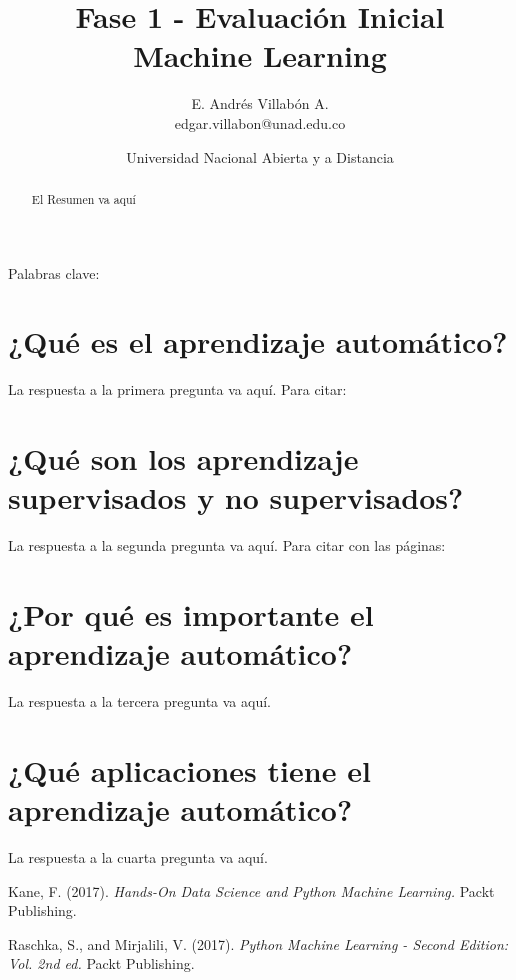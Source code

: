 \documentclass[12pt]{article}
\title{Fase 1 - Evaluación Inicial \\
Machine Learning}
\author{E. Andrés Villabón A.\\
\small{edgar.villabon@unad.edu.co}}
\date{Universidad Nacional Abierta y a Distancia}
\begin{document}
\maketitle
\begin{abstract}
El Resumen va aquí
\end{abstract}

Palabras clave: 

\section{¿Qué es el aprendizaje automático?}
La respuesta a la primera pregunta va aquí. Para citar: \cite{Kane}

\section{¿Qué son los aprendizaje supervisados y no supervisados?}
La respuesta a la segunda pregunta va aquí. Para citar con las páginas: \cite[pag 43-47]{RaMi}

\section{¿Por qué es importante el aprendizaje automático?}
La respuesta a la tercera pregunta va aquí.

\section{¿Qué aplicaciones tiene el aprendizaje automático?}
La respuesta a la cuarta pregunta va aquí.

\begin{thebibliography}{99}
 Kane, F. (2017). \textit{Hands-On Data Science and Python Machine Learning.} Packt Publishing.

 Raschka, S., and Mirjalili, V. (2017). \textit{Python Machine Learning - Second Edition: Vol. 2nd ed.} Packt Publishing.

\end{thebibliography}
\end{document}
